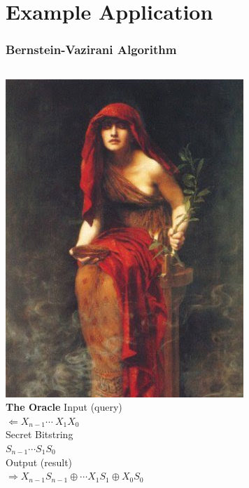 \documentclass[aspectratio=169,11pt,hyperref={colorlinks=true}]{beamer}
\begin{document}
\section{Example Application}
\begin{frame}
    \frametitle{Bernstein-Vazirani Algorithm\footnotemark}
    \begin{columns}
            \centering
            \includegraphics[width=\textwidth]{the_oracle.jpg} \\
            \large \textbf{The Oracle}
        Input (query)\\
        $\Longleftarrow X_{n-1} \dotsb \ X_{1} X_{0} $\\
        \vspace{1.5em}
        Secret Bitstring\\
        $ \boxed{S_{n-1} \dotsb S_{1} S_{0}} $\\
        \vspace{1.5em} 
        Output (result)\\ 
		$\Longrightarrow X_{n-1}S_{n-1} \oplus \dotsb X_{1}S_{1} \oplus X_{0}S_{0} $\\
    \end{columns}
    \vspace{3em}
\end{frame}
\end{document}

